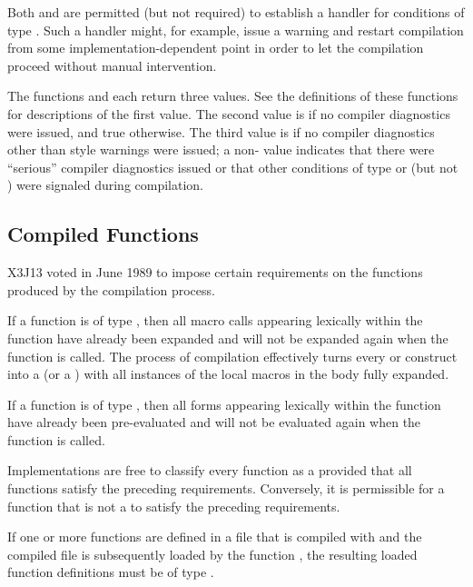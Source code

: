Both  and  are permitted (but not
    required) to establish a handler for conditions of type .
    Such a handler
    might, for example, issue a warning and restart compilation from some
    implementation-dependent point in order to let the compilation
    proceed without manual intervention.

The functions  and  each return three values.
See the definitions of these functions for descriptions of the first value.
    The second value is  if no compiler diagnostics were issued, and
    true otherwise.
    The third value is  if no compiler diagnostics other than style
    warnings were issued; a non- value indicates that there were 
    ``serious'' compiler diagnostics issued or that other conditions of
    type  or  (but not ) were signaled during
    compilation.


\subsection{Compiled Functions}

X3J13 voted in June 1989 
to impose certain requirements on the functions produced by the compilation
process.


If a function is of type , then
all macro calls appearing lexically within the function have 
        already been expanded and will not be expanded again when the
        function is called.  The process of
        compilation effectively turns every  or 
        construct into a  (or a ) with all
        instances of the local macros in the body fully expanded.

If a function is of type , then
all  forms appearing lexically within the function have
        already been pre-evaluated and will not be evaluated
        again when the function is called.
  
Implementations are free to classify every function as 
   a  provided that all functions
satisfy the preceding requirements.
Conversely, it is permissible for a function that is
      not a  to satisfy the preceding requirements.
  
If one or more functions are defined in a file that is compiled
      with  and the compiled file is subsequently loaded
by the function ,
the resulting loaded function definitions must be of
    type .
  
